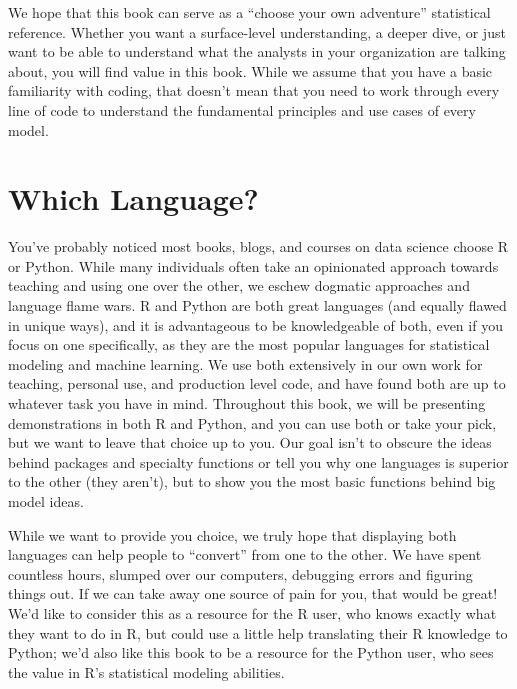 \documentclass[
  letterpaper,
]{krantz}
\begin{document}
We hope that this book can serve as a ``choose your own adventure''
statistical reference. Whether you want a surface-level understanding, a
deeper dive, or just want to be able to understand what the analysts in
your organization are talking about, you will find value in this book.
While we assume that you have a basic familiarity with coding, that
doesn't mean that you need to work through every line of code to
understand the fundamental principles and use cases of every model.

\section*{Which Language?}\label{which-language}


You've probably noticed most books, blogs, and courses on data science
choose R or Python. While many individuals often take an opinionated
approach towards teaching and using one over the other, we eschew
dogmatic approaches and language flame wars. R and Python are both great
languages (and equally flawed in unique ways), and it is advantageous to
be knowledgeable of both, even if you focus on one specifically, as they
are the most popular languages for statistical modeling and machine
learning. We use both extensively in our own work for teaching, personal
use, and production level code, and have found both are up to whatever
task you have in mind. Throughout this book, we will be presenting
demonstrations in both R and Python, and you can use both or take your
pick, but we want to leave that choice up to you. Our goal isn't to
obscure the ideas behind packages and specialty functions or tell you
why one languages is superior to the other (they aren't), but to show
you the most basic functions behind big model ideas.

While we want to provide you choice, we truly hope that displaying both
languages can help people to ``convert'' from one to the other. We have
spent countless hours, slumped over our computers, debugging errors and
figuring things out. If we can take away one source of pain for you,
that would be great! We'd like to consider this as a resource for the R
user, who knows exactly what they want to do in R, but could use a
little help translating their R knowledge to Python; we'd also like this
book to be a resource for the Python user, who sees the value in R's
statistical modeling abilities.
\end{document}
